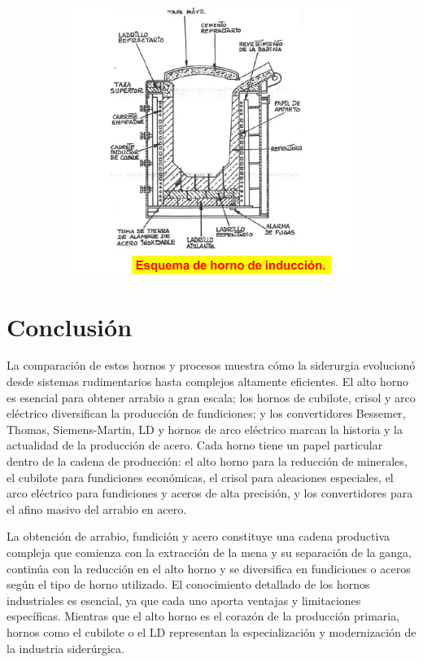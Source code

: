 \documentclass[12pt,a4paper]{article}
\begin{document}
\begin{figure}
\begin{subfigure}{0.45\textwidth}
        \includegraphics[width=\textwidth]{Inagenes para latex/induccion 2.png}
        \label{induccion}
    \end{subfigure}
 \end{figure}

\section{Conclusión}
La comparación de estos hornos y procesos muestra cómo la siderurgia evolucionó desde sistemas rudimentarios hasta complejos altamente eficientes. El alto horno es esencial para obtener arrabio a gran escala; los hornos de cubilote, crisol y arco eléctrico diversifican la producción de fundiciones; y los convertidores Bessemer, Thomas, Siemens-Martin, LD y hornos de arco eléctrico marcan la historia y la actualidad de la producción de acero. Cada horno tiene un papel particular dentro de la cadena de producción: el alto horno para la reducción de minerales, el cubilote para fundiciones económicas, el crisol para aleaciones especiales, el arco eléctrico para fundiciones y aceros de alta precisión, y los convertidores para el afino masivo del arrabio en acero.

La obtención de arrabio, fundición y acero constituye una cadena productiva compleja que comienza con la extracción de la mena y su separación de la ganga, continúa con la reducción en el alto horno y se diversifica en fundiciones o aceros según el tipo de horno utilizado. El conocimiento detallado de los hornos industriales es esencial, ya que cada uno aporta ventajas y limitaciones específicas. Mientras que el alto horno es el corazón de la producción primaria, hornos como el cubilote o el LD representan la especialización y modernización de la industria siderúrgica.
\end{document}
